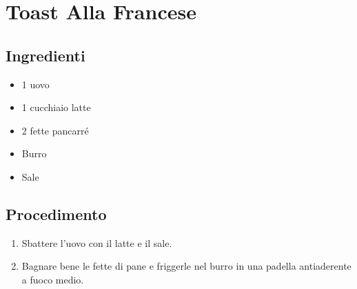 \section{Toast Alla Francese}
\subsection{Ingredienti}
\begin{itemize}
\item 1 uovo  
\item 1 cucchiaio latte  
\item 2 fette pancarré  
\item Burro  
\item Sale
\end{itemize}
\subsection{Procedimento}
\begin{enumerate}
\item  Sbattere l'uovo con il latte e il sale.  
\item  Bagnare bene le fette di pane e friggerle nel burro in una padella antiaderente a fuoco medio.
\end{enumerate}
